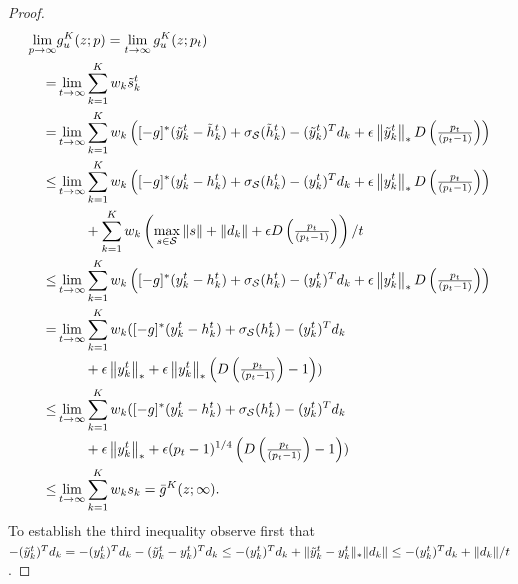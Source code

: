 \begin{proof}
  \begin{align*}
    \lim_{p\to\infty} &g_u^K(z;p) = \lim_{t\to\infty} g_u^K(z;p_t)\\
    =  & \lim_{t\to\infty} \sum_{k=1}^K w_k \tilde s_k^t\\
    {=} & \lim_{t\to\infty} \sum_{k=1}^Kw_k\left([-g]^*(\tilde y^t_{k} - \tilde h^t_{k}) + \sigma_{\mathcal{S}}(\tilde h^t_{k}) - (\tilde y^t_{k})^T{d}_k  +\epsilon \left\|\tilde y^t_{k} \right\|_* D\left(\tfrac{p_t}{(p_t-1)}\right)\right)\\
    \leq &\lim_{t\to\infty} \sum_{k=1}^Kw_k\left([-g]^*(y^t_{k} - h^t_{k}) + \sigma_{\mathcal{S}}(h^t_{k}) - (y^t_{k})^T{d}_k  +\epsilon \left\|y^t_{k} \right\|_* D\left(\tfrac{p_t}{(p_t-1)}\right)\right)\\
                                            & \qquad  + \sum_{k=1}^Kw_k\left(\max_{s\in \mathcal{S}} \| s \|+\| d_k \|+\epsilon D\left(\tfrac{p_t}{(p_t-1)}\right) \right)/t\\
    \leq &\lim_{t\to\infty} \sum_{k=1}^Kw_k\left([-g]^*(y^t_{k} - h^t_{k}) + \sigma_{\mathcal{S}}(h^t_{k}) - (y^t_{k})^T{d}_k  +\epsilon \left\|y^t_{k} \right\|_* D\left(\tfrac{p_t}{(p_t-1)}\right)\right)\\
    {=} &\lim_{t\to\infty} \sum_{k=1}^Kw_k([-g]^*(y^t_{k} - h^t_{k}) + \sigma_{\mathcal{S}}(h^t_{k}) - (y^t_{k})^T{d}_k  \\
		& \qquad +\epsilon \left\|y^t_{k} \right\|_* + \epsilon \left\|y^t_{k} \right\|_* \left(D\left(\tfrac{p_t}{(p_t-1)}\right)-1\right))\\
    \leq &\lim_{t\to\infty} \sum_{k=1}^Kw_k([-g]^*(y^t_{k} - h^t_{k}) + \sigma_{\mathcal{S}}(h^t_{k}) - (y^t_{k})^T{d}_k \\
		& \qquad +\epsilon \left\|y^t_{k} \right\|_* + \epsilon  (p_t-1)^{1/4} \left(D\left(\tfrac{p_t}{(p_t-1)}\right)-1\right))\\
    \leq & \lim_{t\to\infty} \sum_{k=1}^Kw_ks_k = \bar g^K(z;\infty).
  \end{align*}  
  To establish the third inequality observe first that $-(\tilde y^t_{k})^T{d}_k = -(y^t_{k})^T{d}_k - (\tilde y^t_k-y^t_k)^Td_k\leq -(y^t_{k})^T{d}_k + \| \tilde y^t_k-y^t_k \|_* \| d_k \|\leq -(y^t_{k})^T{d}_k + \| d_k \|/t$. 
\end{proof}
